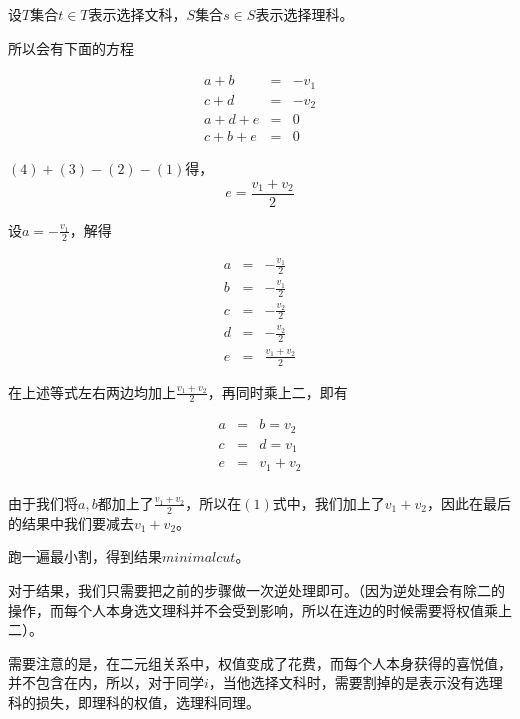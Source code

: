 \documentclass{ctexart}
\numberwithin{equation}{section}
\begin{document}
\begin{flushleft}
  \begin{figure}[htb]        


  \end{figure}


  设$T$集合$t\in T$表示选择文科，$S$集合$s\in S$表示选择理科。

  所以会有下面的方程

   \begin{eqnarray} 
    a + b &=&  -v_1 \\
    c + d &=&  -v_2\\
    a + d + e &=& 0\\
    c + b + e &=& 0
   \end{eqnarray}

   \newpage
   
   $(4)+(3)-(2)-(1)$得，$$e=\frac{v_1+v_2}{2}$$
   
   设$a=-\frac{v_1}{2}$，解得

   \begin{eqnarray} 
    a  &=&  -\frac{v_1}{2} \\
    b  &=&  -\frac{v_1}{2}\\
    c  &=&  -\frac{v_2}{2}\\
    d  &=&  -\frac{v_2}{2}\\
    e  &=&  \frac{v_1+v_2}{2} 
   \end{eqnarray}

   在上述等式左右两边均加上$\frac{v_1+v_2}{2}$，再同时乘上二，即有

   \begin{eqnarray} 
    a &=& b =  v_2 \\
    c &=& d =  v_1\\
    e &=& v_1+v_2\\
   \end{eqnarray}

   由于我们将$a,b$都加上了$\frac{v_1+v_2}{2}$，所以在$(1)$式中，我们加上了$v_1+v_2$，因此在最后的结果中我们要减去$v_1+v_2$。

   跑一遍最小割，得到结果$minimalcut$。

   对于结果，我们只需要把之前的步骤做一次逆处理即可。（因为逆处理会有除二的操作，而每个人本身选文理科并不会受到影响，所以在连边的时候需要将权值乘上二）。

   需要注意的是，在二元组关系中，权值变成了花费，而每个人本身获得的喜悦值，并不包含在内，所以，对于同学$i$，当他选择文科时，需要割掉的是表示没有选理科的损失，即理科的权值，选理科同理。
   

\end{flushleft}
\end{document}
